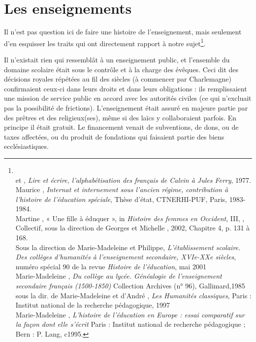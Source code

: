  

\section{Les enseignements}

    
   Il n'est pas question ici de faire une histoire de l'enseignement, mais seulement d'en esquisser les traits qui ont directement rapport à notre sujet\footnote{\\ et , \emph{Lire et écrire, l'alphabétisation des français de Calvin à Jules Ferry}, 1977.
\\Maurice {}, \emph{Internat et internement sous l'ancien régime, contribution à l'histoire de l'éducation spéciale}, Thèse d'état, CTNERHI-PUF, Paris, 1983-1984.
\\Martine {}, {« Une fille à éduquer », in \emph{Histoire des femmes en Occident}, III, }, Collectif, sous la direction de Georges  et Michelle , 2002, Chapitre 4, p. 131 à 168.
\\Sous la direction de Marie-Madeleine  et Philippe, \emph{L’établissement scolaire. Des collèges d'humanités à l'enseignement secondaire, XVIe-XXe siècles}, numéro spécial 90 de la revue \emph{Histoire de l’éducation}, mai 2001
\\ Marie-Madeleine , \emph{Du collège au lycée. Généalogie de l'enseignement secondaire français (1500-1850)}
Collection Archives (n° 96), Gallimard,1985 
\\sous la dir. de Marie-Madeleine  et d'André , \emph{Les Humanités classiques}, Paris : Institut national de la recherche pédagogique, 1997
\\Marie-Madeleine ,	\emph{L'histoire de l'éducation en Europe : essai comparatif sur la façon dont elle s'écrit} Paris : Institut national de recherche pédagogique ; Bern : P. Lang, c1995. }.

 
Il n'existait rien qui ressemblât à un enseignement public, et l'ensemble du domaine scolaire était sous le contrôle et à la charge des évêques. Ceci dit des décisions royales répétées au fil des siècles (à commencer par Charlemagne) confirmaient ceux-ci dans leurs droits et dans leurs obligations : ils remplissaient une mission de service public en accord avec les autorités civiles (ce qui n'excluait pas la possibilité de frictions). L'enseignement était assuré en majeure partie par des prêtres et des religieux(ses), même si des laïcs y collaboraient parfois. En principe il était gratuit. Le financement venait de subventions, de dons, ou de taxes affectées, ou du produit de fondations qui faisaient partie des biens ecclésiastiques.
 
